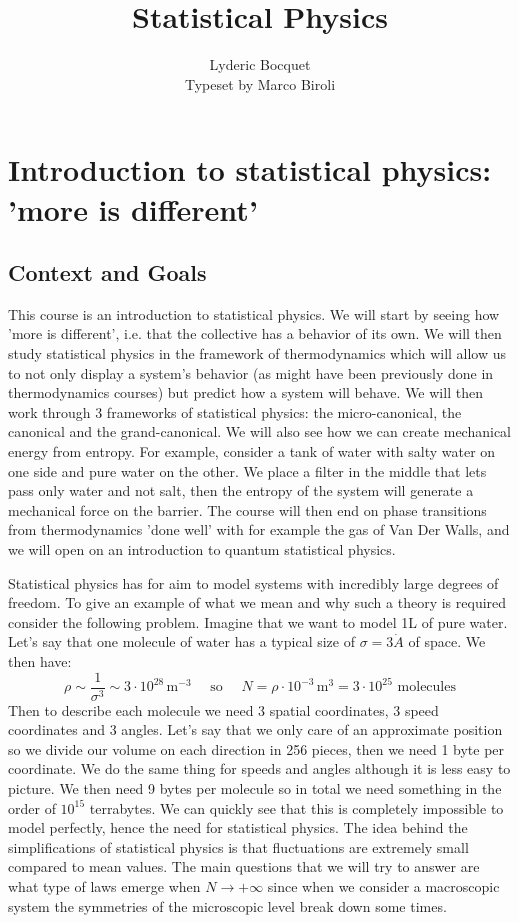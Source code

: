 \documentclass[10pt,a4paper]{book}
\author{Lyderic Bocquet\\Typeset by Marco Biroli}
\title{Statistical Physics}
\begin{document}
\maketitle

\tableofcontents

\chapter{Introduction to statistical physics: 'more is different'}

\section{Context and Goals}

This course is an introduction to statistical physics. We will start by seeing how 'more is different', i.e. that the collective has a behavior of its own. We will then study statistical physics in the framework of thermodynamics which will allow us to not only display a system's behavior (as might have been previously done in thermodynamics courses) but predict how a system will behave. We will then work through 3 frameworks of statistical physics: the micro-canonical, the canonical and the grand-canonical. We will also see how we can create mechanical energy from entropy. For example, consider a tank of water with salty water on one side and pure water on the other. We place a filter in the middle that lets pass only water and not salt, then the entropy of the system will generate a mechanical force on the barrier. The course will then end on phase transitions from thermodynamics 'done well' with for example the gas of Van Der Walls, and we will open on an introduction to quantum statistical physics.

Statistical physics has for aim to model systems with incredibly large degrees of freedom. To give an example of what we mean and why such a theory is required consider the following problem. Imagine that we want to model 1L of pure water. Let's say that one molecule of water has a typical size of $\sigma = 3\dot{A}$ of space. We then have:
\[
\rho \sim \frac{1}{\sigma^3} \sim 3 \cdot 10^{28} \, \text{m}^{-3} \quad \text{ so } \quad N = \rho \cdot 10^{-3} \, \text{m}^3 = 3 \cdot 10^{25} \text{ molecules}
\]
Then to describe each molecule we need 3 spatial coordinates, 3 speed coordinates and 3 angles. Let's say that we only care of an approximate position so we divide our volume on each direction in 256 pieces, then we need 1 byte per coordinate. We do the same thing for speeds and angles although it is less easy to picture. We then need 9 bytes per molecule so in total we need something in the order of $10^{15}$ terrabytes. We can quickly see that this is completely impossible to model perfectly, hence the need for statistical physics. The idea behind the simplifications of statistical physics is that fluctuations are extremely small compared to mean values. The main questions that we will try to answer are what type of laws emerge when $N \to +\infty$ since when we consider a macroscopic system the symmetries of the microscopic level break down some times. 
\end{document}
